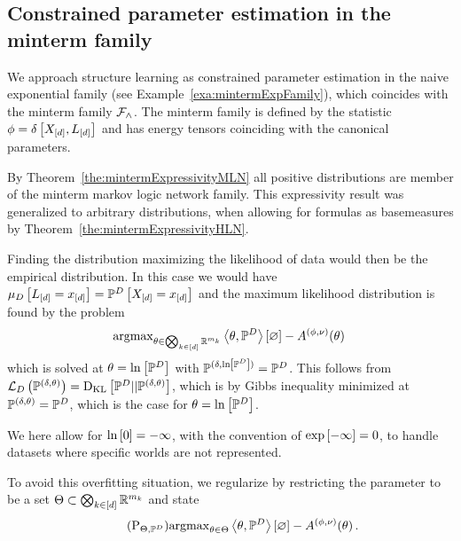 \subsection{Constrained parameter estimation in the minterm family}

We approach structure learning as constrained parameter estimation in the naive exponential family (see Example~\ref{exa:mintermExpFamily}), which coincides with the minterm family $\mathcal{F}_{\land}$.
The minterm family is defined by the statistic $\phi = \delta\left[X_{[d]}, L_{[d]}\right]$ and has energy tensors coinciding with the canonical parameters.



By Theorem~\ref{the:mintermExpressivityMLN} all positive distributions are member of the minterm markov logic network family.
This expressivity result was generalized to arbitrary distributions, when allowing for formulas as basemeasures by Theorem~\ref{the:mintermExpressivityHLN}.

Finding the distribution maximizing the likelihood of data would then be the empirical distribution.
In this case we would have $\mu_{D}\left[L_{[d]}=x_{[d]}\right] = \mathbb{P}^{D}\left[X_{[d]}=x_{[d]}\right]$ and the maximum likelihood distribution is found by the problem
\begin{align*}
	\mathrm{argmax}_{\theta\in\bigotimes_{k\in[d]} \mathbb{R}^{m_{k}}}  \left\langle \theta,\mathbb{P}^{D}\right\rangle \left[ \varnothing \right] - A^{(\phi,\nu)}(\theta) \, 
\end{align*}
which is solved at $\theta=\ln \left[ \mathbb{P}^{D} \right]$ with $\mathbb{P}^{(\delta,\ln \left[ \mathbb{P}^{D} \right])}= \mathbb{P}^{D}$.
This follows from $\mathcal{L}_{D}\left(\mathbb{P}^{(\delta,\theta)}\right)=\mathrm{D}_{\mathrm{KL}}\left[ \mathbb{P}^{D} || \mathbb{P}^{(\delta,\theta)} \right]$, which is by Gibbs inequality minimized at $\mathbb{P}^{(\delta,\theta)}=\mathbb{P}^{D}$, which is the case for $\theta = \ln \left[ \mathbb{P}^{D} \right]$.

We here allow for $\ln \left[ 0 \right]=-\infty$, with the convention of $\mathrm{exp}\left[-\infty\right]=0$, to handle datasets where specific worlds are not represented. 


To avoid this overfitting situation, we regularize by restricting the parameter to be a set $\Theta\subset\bigotimes_{k\in[d]} \mathbb{R}^{m_{k}}$ and state
\begin{align}\tag{$\mathrm{P}_{\energyhypothesis, \empdistribution}$}\label{prob:restrictedNaiveMLE}
	\argmax_{\canparam\in\energyhypothesis}  \sbcontraction{\canparam,\empdistribution} - \cumfunctionof{\canparam} \, . 
\end{align}

